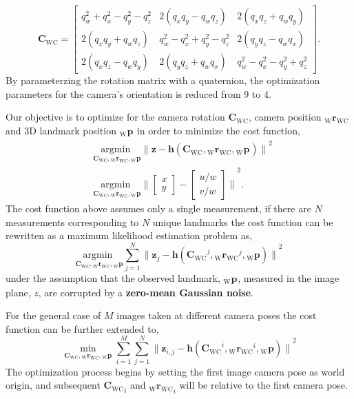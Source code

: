 \documentclass{report}
\renewcommand{\Vec}[1]{{\mathbf{#1}}}
\newcommand{\Mat}[1]{{\mathbf{#1}}}
\newcommand{\Norm}[1]{{\|#1\|}}
\newcommand{\Argmin}[1]{\underset{#1}{{\text{argmin }}}}
\newcommand{\cam}{{\text{C}}}
\newcommand{\world}{{\text{W}}}
\newcommand{\KineNotationTransform}[3]{{{#1}_{#2#3}}}
\newcommand{\KineNotation}[3]{{{{}_{#2}} {#1}_{#2#3}}}
\newcommand{\KineNotationPart}[3]{{{{}_{#2}} {#1}_{#3}}}
\newcommand{\KineNotationBare}[2]{{{{}_{#2}} {#1}}}
\newcommand{\pos}{{\Vec{r}}}
\newcommand{\Pos}[2]{{\KineNotation{\pos}{#1}{#2}}}
\newcommand{\rot}{{\Mat{C}}}
\newcommand{\Rot}[2]{{\KineNotationTransform{\rot}{#1}{#2}}}
\newcommand{\point}{\Vec{p}}
\newcommand{\Pt}[1]{{\KineNotationPart{\point}{#1}{}}}
\newcommand{\Point}[2]{{\KineNotationBare{\point}{#1}}}
\newcommand{\camRot}{{\Rot{\world}{\cam}}}
\newcommand{\camPos}{{\Pos{\world}{\cam}}}
\newcommand{\projFunc}{{\Vec{h}}}
\newcommand{\measurement}{{\Vec{z}}}
\begin{document}
\begin{equation}
  \camRot = \begin{bmatrix}
    q_{w}^{2} + q_{x}^{2} - q_{y}^{2} - q_{z}^{2}
    & 2 (q_{x} q_{y} - q_{w} q_{z})
    & 2 (q_{x} q_{z} + q_{w} q_{y}) \\
    2 (q_{x} q_{y} + q_{w} q_{z})
    & q_{w}^{2} - q_{x}^{2} + q_{y}^{2} - q_{z}^{2}
    & 2 (q_{y} q_{z} - q_{w} q_{x}) \\
    2 (q_{x} q_{z} - q_{w} q_{y})
    & 2 (q_{y} q_{z} + q_{w} q_{x})
    & q_{w}^{2} - q_{x}^{2} - q_{y}^{2} + q_{z}^{2}
  \end{bmatrix}.
\end{equation}
%
By parameterzing the rotation matrix with a quaternion, the optimization
parameters for the camera's orientation is reduced from 9 to 4.

Our objective is to optimize for the camera rotation $\camRot$, camera
position $\camPos$ and 3D landmark position $\Pt{\world}$ in order to
minimize the cost function,
%
\begin{align}
  &\Argmin{\camRot, \camPos, \Pt{\world}} \Norm{
    \measurement - \projFunc(\camRot, \camPos, \Pt{\world})
  }^{2} \\
  &\Argmin{\camRot, \camPos, \Pt{\world}} \Norm{
    \begin{bmatrix} x \\ y \end{bmatrix} -
    \begin{bmatrix} u / w \\ v / w \end{bmatrix}
    }^{2}.
\end{align}
%
The cost function above assumes only a single measurement, if there are $N$
measurements corresponding to $N$ unique landmarks the cost function can be
rewritten as a maximum likelihood estimation problem as,
%
\begin{equation}
  \Argmin{\camRot, \camPos, \Pt{\world}}
  \sum_{j = 1}^{N}
  \Norm{
    \measurement_{j} - \projFunc(\camRot^{j}, \camPos^{j}, \Point{\world}{j})
  }^{2}
\end{equation}
%
under the assumption that the observed landmark, $\Pt{\world}$, measured in
the image plane, $z$, are corrupted by a \textbf{zero-mean Gaussian noise}.

For the general case of $M$ images taken at different camera poses the cost
function can be further extended to,
%
\begin{equation}
  \min_{\camRot, \camPos, \Pt{\world}} 
  \sum_{i = 1}^{M} \sum_{j = 1}^{N}
  \Norm{
    \measurement_{i, j}
    - \projFunc(\camRot^{i}, \camPos^{i}, \Point{\world}{j})
  }^{2}
\end{equation}
%
The optimization process begins by setting the first image camera pose as world
origin, and subsequent $\camRot_{i}$ and $\camPos_{i}$ will be relative to the
first camera pose.
\end{document}

